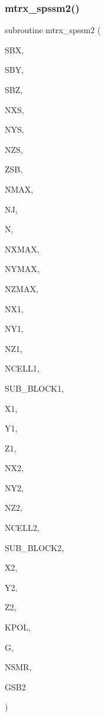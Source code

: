 \subsubsection{\texorpdfstring{mtrx\+\_\+spssm2()}{mtrx\_spssm2()}}
{\footnotesize\ttfamily subroutine mtrx\+\_\+spssm2 (\begin{DoxyParamCaption}\item[{real}]{S\+BX,  }\item[{real}]{S\+BY,  }\item[{real}]{S\+BZ,  }\item[{integer}]{N\+XS,  }\item[{integer}]{N\+YS,  }\item[{integer}]{N\+ZS,  }\item[{real}]{Z\+SB,  }\item[{integer}]{N\+M\+AX,  }\item[{integer}]{NJ,  }\item[{integer}]{N,  }\item[{integer}]{N\+X\+M\+AX,  }\item[{integer}]{N\+Y\+M\+AX,  }\item[{integer}]{N\+Z\+M\+AX,  }\item[{integer, dimension(sub\+\_\+block1)}]{N\+X1,  }\item[{integer, dimension(sub\+\_\+block1)}]{N\+Y1,  }\item[{integer, dimension(sub\+\_\+block1)}]{N\+Z1,  }\item[{integer, dimension(sub\+\_\+block1)}]{N\+C\+E\+L\+L1,  }\item[{integer}]{S\+U\+B\+\_\+\+B\+L\+O\+C\+K1,  }\item[{real, dimension(nxmax,sub\+\_\+block1)}]{X1,  }\item[{real, dimension(nymax,sub\+\_\+block1)}]{Y1,  }\item[{real, dimension(nzmax,sub\+\_\+block1)}]{Z1,  }\item[{integer, dimension(sub\+\_\+block2)}]{N\+X2,  }\item[{integer, dimension(sub\+\_\+block2)}]{N\+Y2,  }\item[{integer, dimension(sub\+\_\+block2)}]{N\+Z2,  }\item[{integer, dimension(sub\+\_\+block2)}]{N\+C\+E\+L\+L2,  }\item[{integer}]{S\+U\+B\+\_\+\+B\+L\+O\+C\+K2,  }\item[{real, dimension(nxmax,sub\+\_\+block2)}]{X2,  }\item[{real, dimension(nymax,sub\+\_\+block2)}]{Y2,  }\item[{real, dimension(nzmax,sub\+\_\+block2)}]{Z2,  }\item[{integer}]{K\+P\+OL,  }\item[{complex, dimension(nmax,n)}]{G,  }\item[{integer}]{N\+S\+MR,  }\item[{complex, dimension(nsmr/3,3)}]{G\+S\+B2 }\end{DoxyParamCaption})}

